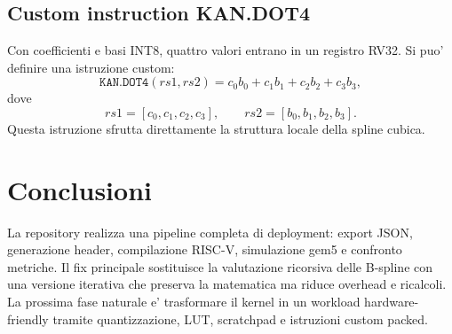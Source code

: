 \documentclass[conference]{IEEEtran}
\begin{document}
\subsection{Custom instruction KAN.DOT4}
Con coefficienti e basi INT8, quattro valori entrano in un registro RV32. Si puo' definire una istruzione custom:
\begin{equation}
\texttt{KAN.DOT4}(rs1,rs2) = c_0b_0+c_1b_1+c_2b_2+c_3b_3,
\end{equation}
dove
\begin{equation}
rs1=[c_0,c_1,c_2,c_3], \qquad rs2=[b_0,b_1,b_2,b_3].
\end{equation}
Questa istruzione sfrutta direttamente la struttura locale della spline cubica.

\section{Conclusioni}
La repository realizza una pipeline completa di deployment: export JSON, generazione header, compilazione RISC-V, simulazione gem5 e confronto metriche. Il fix principale sostituisce la valutazione ricorsiva delle B-spline con una versione iterativa che preserva la matematica ma riduce overhead e ricalcoli. La prossima fase naturale e' trasformare il kernel in un workload hardware-friendly tramite quantizzazione, LUT, scratchpad e istruzioni custom packed.
\end{document}
